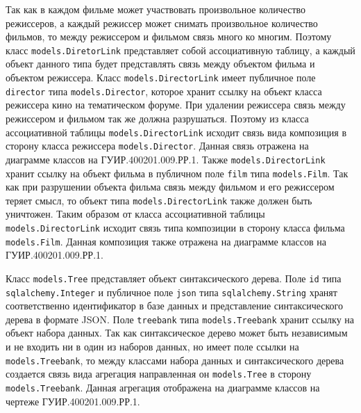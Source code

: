 Так как в каждом фильме может участвовать произвольное количество режиссеров, а каждый режиссер может снимать произвольное количество фильмов, то между режиссером и фильмом связь много ко многим. Поэтому класс \texttt{mo\-dels.DiretorLink} представляет собой ассоциативную таблицу, а каждый объект данного типа будет представлять связь между объектом фильма и объектом режиссера. Класс \texttt{mo\-dels.DirectorLink} имеет публичное поле \texttt{director} типа \texttt{mo\-dels.Director}, которое хранит ссылку на объект класса режиссера кино на тематическом форуме. При удалении режиссера связь между режиссером и фильмом так же должна разрушаться. Поэтому из класса ассоциативной таблицы \texttt{mo\-dels.DirectorLink} исходит связь вида композиция в сторону класса режиссера \texttt{mo\-dels.Director}. Данная связь отражена на диаграмме классов на ГУИР.400201.009.РР.1. Также \texttt{mo\-dels.Di\-rectorLink} хранит ссылку на объект фильма в публичном поле \texttt{film} типа \texttt{mo\-dels.Film}. Так как при разрушении объекта фильма связь между фильмом и его режиссером теряет смысл, то объект типа \texttt{mo\-dels.DirectorLink} также должен быть уничтожен. Таким образом от класса ассоциативной таблицы \texttt{mo\-dels.DirectorLink} исходит связь типа композиции в сторону класса фильма \texttt{mo\-dels.Film}. Данная композиция также отражена на диаграмме классов на ГУИР.400201.009.РР.1.

Класс \texttt{mo\-dels.Tree} представляет объект синтаксического дерева. Поле \texttt{id} типа \texttt{sqlalch\-emy.Integer} и публичное поле \texttt{json} типа \texttt{sqlal\-chemy.String} хранят соответственно идентификатор в базе данных и представление синтаксического дерева в формате JSON\@. Поле \texttt{treebank} типа \texttt{mo\-dels.Tree\-bank} хранит ссылку на объект набора данных. Так как синтаксическое дерево может быть независимым и не входить ни в один из наборов данных, но имеет поле ссылки на \texttt{mo\-dels.Treebank}, то между классами набора данных и синтаксического дерева создается связь вида агрегация направленная он \texttt{mo\-dels.Tree} в сторону \texttt{mo\-dels.Tree\-bank}. Данная агрегация отображена на диаграмме классов на чертеже ГУИР.400201.009.РР.1.
